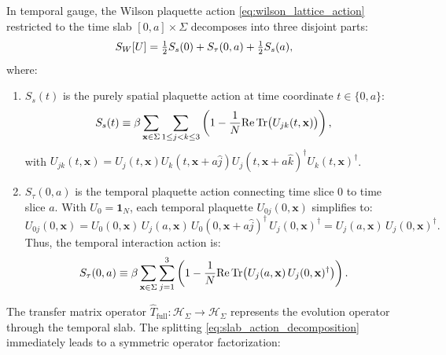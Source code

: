 In temporal gauge, the Wilson plaquette action \eqref{eq:wilson_lattice_action} restricted to the time slab $[0, a] \times \Sigma$ decomposes into three disjoint parts:
\begin{equation}
\label{eq:slab_action_decomposition}
S_W[U] = \tfrac{1}{2} S_s(0) + S_\tau(0, a) + \tfrac{1}{2} S_s(a),
\end{equation}
where:
\begin{enumerate}
    \item $S_s(t)$ is the purely spatial plaquette action at time coordinate $t \in \{0, a\}$:
    \begin{equation}
    \label{eq:spatial_action_def}
    S_s(t) \equiv \beta \sum_{\mathbf{x} \in \Sigma} \sum_{1 \le j < k \le 3} \left( 1 - \frac{1}{N} \mathrm{Re} \, \mathrm{Tr}\bigl( U_{jk}(t, \mathbf{x}) \bigr) \right),
    \end{equation}
    with $U_{jk}(t, \mathbf{x}) = U_j(t, \mathbf{x}) U_k(t, \mathbf{x}+a\hat{j}) U_j(t, \mathbf{x}+a\hat{k})^\dagger U_k(t, \mathbf{x})^\dagger$.
    
    \item $S_\tau(0, a)$ is the temporal plaquette action connecting time slice $0$ to time slice $a$. With $U_0 = \mathbf{1}_N$, each temporal plaquette $U_{0j}(0, \mathbf{x})$ simplifies to:
    \begin{equation}
    U_{0j}(0, \mathbf{x}) = U_0(0, \mathbf{x}) \, U_j(a, \mathbf{x}) \, U_0(0, \mathbf{x}+a\hat{j})^\dagger \, U_j(0, \mathbf{x})^\dagger = U_j(a, \mathbf{x}) \, U_j(0, \mathbf{x})^\dagger.
    \end{equation}
    Thus, the temporal interaction action is:
    \begin{equation}
    \label{eq:temporal_action_def}
    S_\tau(0, a) \equiv \beta \sum_{\mathbf{x} \in \Sigma} \sum_{j=1}^3 \left( 1 - \frac{1}{N} \mathrm{Re} \, \mathrm{Tr}\bigl( U_j(a, \mathbf{x}) \, U_j(0, \mathbf{x})^\dagger \bigr) \right).
    \end{equation}
\end{enumerate}

The transfer matrix operator $\hat{T}_{\mathrm{full}} : \mathcal{H}_\Sigma \to \mathcal{H}_\Sigma$ represents the evolution operator through the temporal slab. The splitting \eqref{eq:slab_action_decomposition} immediately leads to a symmetric operator factorization:

